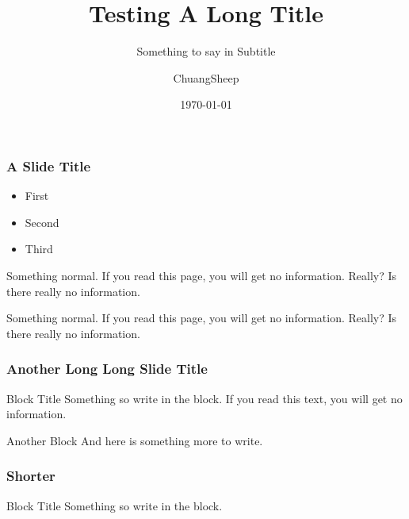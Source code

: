 \documentclass[american,aspectratio=169]{beamer}
\title{Testing A Long Title}
\subtitle{Something to say in Subtitle}
\date{\today}
\author{ChuangSheep}
\begin{document}
\begin{frame} 
  \titlepage
\end{frame} 


\begin{iframe}
  \frametitle{A Slide Title}

  \begin{itemize}
    \item First
    \item Second 
    \item Third
  \end{itemize}

  Something normal. If you read this page, you will get no information. Really? Is there really no information.

  Something normal. If you read this page, you will get no information. Really? Is there really no information.
\end{iframe}

\begin{indentedframe}
  \frametitle{Another Long Long Slide Title}
  \begin{block}{Block Title}
    Something so write in the block. If you read this text, you will get no information. 
  \end{block}
  \begin{block}{Another Block}
    And here is something more to write. 
  \end{block}
\end{indentedframe}

\begin{indentedframe}
  \frametitle{Shorter}
  \begin{block}{Block Title}
    Something so write in the block. 
  \end{block}
\end{indentedframe}
\end{document}
